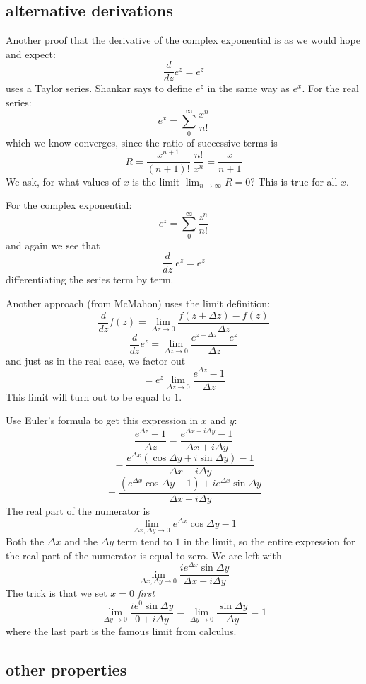 \documentclass[11pt, oneside]{article}
\begin{document}
\subsection*{alternative derivations}

Another proof that the derivative of the complex exponential is as we would hope and expect:
\[ \frac{d}{dz} e^z = e^z \]
uses a Taylor series.  Shankar says to define $e^z$ in the same way as $e^x$.  For the real series:
\[ e^x = \sum_0^{\infty} \frac{x^n}{n!} \]
which we know converges, since the ratio of successive terms is
\[ R = \frac{x^{n+1}}{(n+1)!} \ \frac{n!}{x^n} = \frac{x}{n+1} \]
We ask, for what values of $x$ is the limit $\lim_{n \rightarrow \infty} R = 0$?  This is true for all $x$.

For the complex exponential:
\[ e^z = \sum_0^{\infty} \frac{z^n}{n!} \]
and again we see that 
\[ \frac{d}{dz} \ e^z = e^z \]
differentiating the series term by term.

Another approach (from McMahon) uses the limit definition:
\[ \frac{d}{dz} f(z) = \lim_{\Delta z \rightarrow 0} \frac{f(z + \Delta z) - f(z)}{\Delta z} \]
\[ \frac{d}{dz} e^z =  \lim_{\Delta z \rightarrow 0}  \frac{e^{z + \Delta z} - e^z}{\Delta z} \]
and just as in the real case, we factor out 
\[ =  e^z \lim_{\Delta z \rightarrow 0}  \frac{e^{\Delta z} - 1}{\Delta z} \]
This limit will turn out to be equal to $1$.  

Use Euler's formula to get this expression in $x$ and $y$:
\[ \frac{e^{\Delta z} - 1}{\Delta z} =  \frac{e^{\Delta x + i \Delta y} - 1}{\Delta x + i \Delta y} \]
\[ = \frac{e^{\Delta x} (\cos \Delta y + i \sin \Delta y) - 1}{\Delta x + i \Delta y} \]
\[ = \frac{(e^{\Delta x} \cos \Delta y - 1) + i  e^{\Delta x} \sin \Delta y}{\Delta x + i \Delta y} \]
The real part of the numerator is
\[ \lim_{\Delta x, \Delta y \rightarrow 0} e^{\Delta x} \cos \Delta y - 1 \]
Both the $\Delta x$ and the $\Delta y$ term tend to $1$ in the limit, so the entire expression for the real part of the numerator is equal to zero.  We are left with
\[ \lim_{\Delta x, \Delta y \rightarrow 0}  \frac{i  e^{\Delta x} \sin \Delta y}{\Delta x + i \Delta y} \]
The trick is that we set $x = 0$ \emph{first}
\[ \lim_{\Delta y \rightarrow 0}  \frac{i  e^0 \sin \Delta y}{0 + i \Delta y} = \lim_{\Delta y \rightarrow 0}  \frac{\sin \Delta y}{\Delta y} = 1 \]
where the last part is the famous limit from calculus.

\subsection*{other properties}
\end{document}
